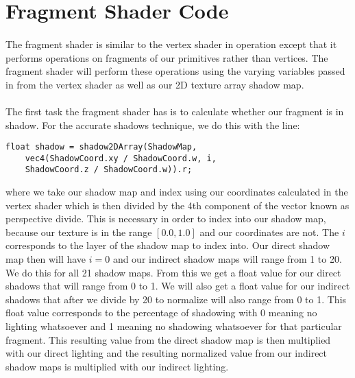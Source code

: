 \section{Fragment Shader Code}\label{sec:fragShader}
\paragraph{}
The fragment shader is similar to the vertex shader in operation except that it performs operations on fragments of our primitives rather than vertices.  The fragment shader will perform these operations using the varying variables passed in from the vertex shader as well as our 2D texture array shadow map.

\paragraph{}
The first task the fragment shader has is to calculate whether our fragment is in shadow.  For the accurate shadows technique, we do this with the line:

\begin{lstlisting}
float shadow = shadow2DArray(ShadowMap, 
	vec4(ShadowCoord.xy / ShadowCoord.w, i, 
	ShadowCoord.z / ShadowCoord.w)).r;
\end{lstlisting}

where we take our shadow map and index using our coordinates calculated in the vertex shader which is then divided by the 4th component of the vector known as perspective divide.  This is necessary in order to index into our shadow map, because our texture is in the range $[0.0, 1.0]$ and our coordinates are not.  The $i$ corresponds to the layer of the shadow map to index into.  Our direct shadow map then will have $i=0$ and our indirect shadow maps will range from 1 to 20.  We do this for all 21 shadow maps.  From this we get a float value for our direct shadows that will range from 0 to 1.  We will also get a float value for our indirect shadows that after we divide by 20 to normalize will also range from 0 to 1.  This float value corresponds to the percentage of shadowing with 0 meaning no lighting whatsoever and 1 meaning no shadowing whatsoever for that particular fragment.  This resulting value from the direct shadow map is then multiplied with our direct lighting and the resulting normalized value from our indirect shadow maps is multiplied with our indirect lighting.


